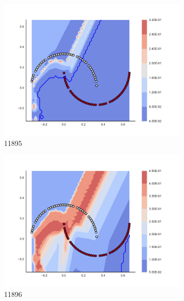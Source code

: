 \begin{figure}[h]
\begin{subfigure}[b]{0.09\textwidth}
    \includegraphics[clip, trim=2.35cm 1.75cm 4.5cm 0cm,width=\textwidth]{img/convergence/11895.pdf}
    \caption{11895}
    \label{fig:convergence_11895}
\end{subfigure}
%
\begin{subfigure}[b]{0.09\textwidth}
    \includegraphics[clip, trim=2.35cm 1.75cm 4.5cm 0cm,width=\textwidth]{img/convergence/11896.pdf}
    \caption{11896}
    \label{fig:convergence_11896}
\end{subfigure}
%
\begin{subfigure}[b]{0.09\textwidth}

\end{subfigure}
\end{figure}
